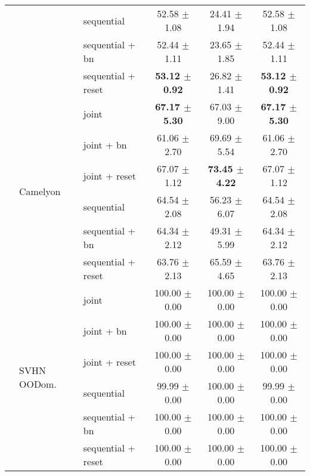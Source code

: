 \begin{table}[!htb]
\begin{tabular}{lllccc}
& &sequential &52.58 $\pm$ 1.08 &24.41 $\pm$ 1.94 &52.58 $\pm$ 1.08 \\
& &sequential + bn &52.44 $\pm$ 1.11 &23.65 $\pm$ 1.85 &52.44 $\pm$ 1.11 \\
& &sequential + reset &\textbf{53.12 $\pm$ 0.92} &26.82 $\pm$ 1.41 &\textbf{53.12 $\pm$ 0.92} \\
\cmidrule[0.1pt](lr){2-6}
&\multirow{6}{*}{Camelyon} &joint &\textbf{67.17 $\pm$ 5.30} &67.03 $\pm$ 9.00 &\textbf{67.17 $\pm$ 5.30} \\
& &joint + bn &61.06 $\pm$ 2.70 &69.69 $\pm$ 5.54 &61.06 $\pm$ 2.70 \\
& &joint + reset &67.07 $\pm$ 1.12 &\textbf{73.45 $\pm$ 4.22} &67.07 $\pm$ 1.12 \\
& &sequential &64.54 $\pm$ 2.08 &56.23 $\pm$ 6.07 &64.54 $\pm$ 2.08 \\
& &sequential + bn &64.34 $\pm$ 2.12 &49.31 $\pm$ 5.99 &64.34 $\pm$ 2.12 \\
& &sequential + reset &63.76 $\pm$ 2.13 &65.59 $\pm$ 4.65 &63.76 $\pm$ 2.13 \\
\cmidrule[0.1pt](lr){2-6}
&\multirow{6}{*}{SVHN OODom.} &joint &100.00 $\pm$ 0.00 &100.00 $\pm$ 0.00 &100.00 $\pm$ 0.00 \\
& &joint + bn &100.00 $\pm$ 0.00 &100.00 $\pm$ 0.00 &100.00 $\pm$ 0.00 \\
& &joint + reset &100.00 $\pm$ 0.00 &100.00 $\pm$ 0.00 &100.00 $\pm$ 0.00 \\
& &sequential &99.99 $\pm$ 0.00 &100.00 $\pm$ 0.00 &99.99 $\pm$ 0.00 \\
& &sequential + bn &100.00 $\pm$ 0.00 &100.00 $\pm$ 0.00 &100.00 $\pm$ 0.00 \\
& &sequential + reset &100.00 $\pm$ 0.00 &100.00 $\pm$ 0.00 &100.00 $\pm$ 0.00 \\

\midrule


\end{tabular}
\end{table}
